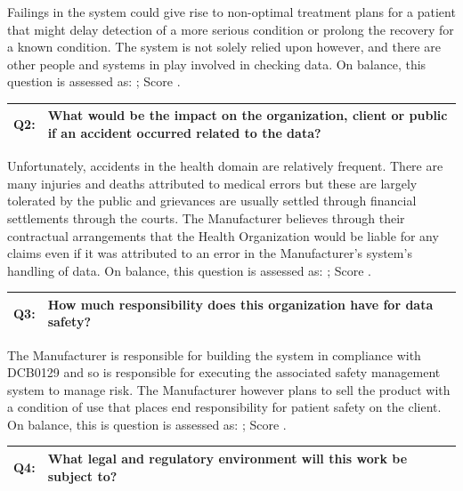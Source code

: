 Failings in the system could give rise to non-optimal treatment plans for a patient that might delay detection of a more serious condition or prolong the recovery for a known condition. The system is not solely relied upon however, and there are other people and systems in play involved in checking data. On balance, this question is assessed as: ; Score .

\begin{longtable*}[H]
  {|L{}|L{}|}
  \hline
  Q2: & What would be the impact on the organization, client or public if an accident occurred related to the data?\\
  \hline
\end{longtable*}

Unfortunately, accidents in the health domain are relatively frequent. There are many injuries and deaths attributed to medical errors but these are largely tolerated by the public and grievances are usually settled through financial settlements through the courts. The Manufacturer believes through their contractual arrangements that the Health Organization would be liable for any claims even if it was attributed to an error in the Manufacturer's system's handling of data. On balance, this question is assessed as: ; Score .

\clearpage %
\begin{longtable*}[H]
  {|L{}|L{}|}
  \hline
  Q3: & How much responsibility does this organization have for data safety?\\
  \hline
\end{longtable*}

The Manufacturer is responsible for building the system in compliance with
DCB0129 \cite{citation:dcb0129clinical}
and so is responsible for executing the associated safety management system to manage risk. The Manufacturer however plans to sell the product with a condition of use that places end responsibility for patient safety on the client. On balance, this is question is assessed as: ; Score .

\begin{longtable*}[H]
  {|L{}|L{}|}
  \hline
  Q4: & What legal and regulatory environment will this work be subject to?\\
  \hline
\end{longtable*}

